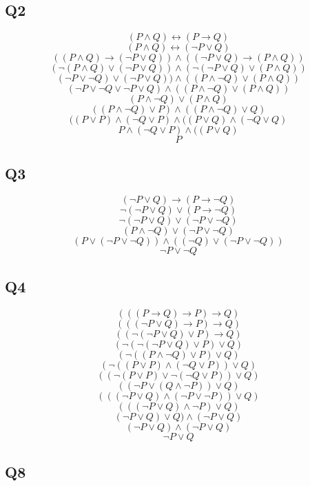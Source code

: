 \documentclass[a4paper,12pt]{article}
\begin{document}
\subsection{Q2}
\[(P \wedge Q) \leftrightarrow (P \rightarrow Q)\]
\[(P \wedge Q) \leftrightarrow (\lnot P \vee Q)\]
\[((P \wedge Q) \rightarrow (\lnot P \vee Q)) \wedge 
  ((\lnot P \vee Q) \rightarrow (P \wedge Q)) \]
\[(\lnot (P \wedge Q)\vee (\lnot P \vee Q)) \wedge 
  (\lnot (\lnot P \vee Q) \vee (P \wedge Q)) \]
\[(\lnot P \vee \lnot Q)\vee (\lnot P \vee Q)) \wedge 
  ((P \wedge \lnot Q) \vee (P \wedge Q)) \]
\[(\lnot P \vee \lnot Q\vee \lnot P \vee Q) \wedge 
  ((P \wedge \lnot Q) \vee (P \wedge Q)) \]
\[ (P \wedge \lnot Q) \vee (P \wedge Q) \]
\[ ((P \wedge \lnot Q) \vee P) \wedge ((P \wedge \lnot Q)  \vee Q) \]
\[ ((P \vee P) \wedge (\lnot Q \vee P) \wedge ((P \vee Q)\wedge 
  (\lnot Q \vee Q) \]
\[ P \wedge (\lnot Q \vee P) \wedge ((P \vee Q)\]
\[P\]
\subsection{Q3}
\[(\lnot P \vee Q) \rightarrow (P \rightarrow \lnot Q)\]
\[\lnot (\lnot P \vee Q) \vee (P \rightarrow \lnot Q)\]
\[\lnot (\lnot P \vee Q) \vee (\lnot P \vee \lnot Q)\]
\[(P \wedge \lnot Q) \vee (\lnot P \vee \lnot Q)\]
\[(P \vee (\lnot P \vee \lnot Q)) \wedge ((\lnot Q) \vee (\lnot P \vee \lnot Q))\]
\[ \lnot P \vee \lnot Q\]


\subsection{Q4}
\[(((P \rightarrow Q) \rightarrow P) \rightarrow Q)\]
\[(((\lnot P \vee Q) \rightarrow P) \rightarrow Q)\]
\[((\lnot (\lnot P \vee Q) \vee P) \rightarrow Q)\]
\[(\lnot (\lnot (\lnot P \vee Q) \vee P) \vee Q)\]
\[(\lnot ((P \wedge \lnot Q) \vee P) \vee Q)\]
\[(\lnot ((P \vee P) \wedge (\lnot Q \vee P)) \vee Q)\]
\[((\lnot (P \vee P) \vee \lnot (\lnot Q \vee P)) \vee Q)\]
\[((\lnot P \vee (Q \wedge \lnot P)) \vee Q)\]
\[(((\lnot P \vee Q )\wedge (\lnot P \vee \lnot P)) \vee Q)\]
\[(((\lnot P \vee Q )\wedge \lnot P) \vee Q)\]
\[(\lnot P \vee Q )\vee Q) \wedge (\lnot P \vee Q)\]
\[(\lnot P \vee Q) \wedge (\lnot P \vee Q)\]
\[\lnot P \vee Q\]



\subsection{Q8}
\end{document}
